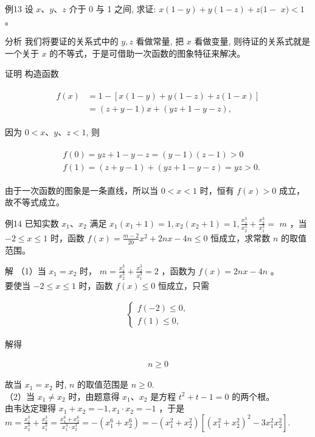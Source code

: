 \documentclass[10pt]{article}
\begin{document}
例13 设 $x 、 y 、 z$ 介于 0 与 1 之间, 求证: $x(1-y)+y(1-z)+z(1-$ $x)<1$ 。

分析 我们将要证的关系式中的 $y, z$ 看做常量, 把 $x$ 看做变量, 则待证的关系式就是一个关于 $x$ 的不等式，于是可借助一次函数的图象特征来解决。

证明 构造函数

\begin{align*}
\begin{aligned}
f(x) & =1-[x(1-y)+y(1-z)+z(1-x)] \\
& =(z+y-1) x+(y z+1-y-z),
\end{aligned}
\end{align*}

因为 $0<x 、 y 、 z<1$, 则

\begin{align*}
\begin{aligned}
& f(0)=y z+1-y-z=(y-1)(z-1)>0 \\
& f(1)=(z+y-1)+(y z+1-y-z)=y z>0 .
\end{aligned}
\end{align*}

由于一次函数的图象是一条直线，所以当 $0<x<1$ 时，恒有 $f(x)>0$ 成立，故不等式成立。

例14 已知实数 $x_{1} 、 x_{2}$ 满足 $x_{1}\left(x_{1}+1\right)=1, x_{2}\left(x_{2}+1\right)=1, \frac{x_{1}^{3}}{x_{2}^{3}}+\frac{x_{2}^{3}}{x_{1}^{3}}=$ $m$ ，当 $-2 \leqslant x \leqslant 1$ 时，函数 $f(x)=\frac{m-2}{20} x^{2}+2 n x-4 n \leqslant 0$ 恒成立，求常数 $n$ 的取值范围。

解 （1）当 $x_{1}=x_{2}$ 时， $m=\frac{x_{1}^{3}}{x_{2}^{3}}+\frac{x_{2}^{3}}{x_{1}^{3}}=2$ ，函数为 $f(x)=2 n x-4 n$ 。\\
要使当 $-2 \leqslant x \leqslant 1$ 时，函数 $f(x) \leqslant 0$ 恒成立，只需

\begin{align*}
\left\{\begin{array}{l}
f(-2) \leqslant 0, \\
f(1) \leqslant 0,
\end{array}\right.
\end{align*}

解得

\begin{align*}
n \geqslant 0
\end{align*}

故当 $x_{1}=x_{2}$ 时, $n$ 的取值范围是 $n \geqslant 0$.\\
（2）当 $x_{1} \neq x_{2}$ 时，由题意得 $x_{1} 、 x_{2}$ 是方程 $t^{2}+t-1=0$ 的两个根。\\
由韦达定理得 $x_{1}+x_{2}=-1, x_{1} \cdot x_{2}=-1$ ，于是 $m=\frac{x_{1}^{3}}{x_{2}^{3}}+\frac{x_{2}^{3}}{x_{1}^{3}}=\frac{x_{1}^{6}+x_{2}^{6}}{x_{1}^{3} \cdot x_{2}^{3}}=-\left(x_{1}^{6}+x_{2}^{6}\right)=-\left(x_{1}^{2}+x_{2}^{2}\right)\left[\left(x_{1}^{2}+x_{2}^{2}\right)^{2}-3 x_{1}^{2} x_{2}^{2}\right]$.
\end{document}
